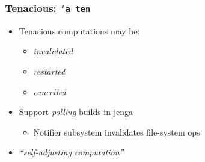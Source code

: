 \documentclass{beamer}
\begin{document}
% 
% 
% 


\begin{frame}[fragile]
\huge
\begin{center}
\end{center}
\end{frame}

% 

% 


\begin{frame}[fragile]
\frametitle{Tenacious: {\tt 'a ten}}
\begin{itemize}
\item Tenacious computations may be:
\begin{itemize}
\item {\em invalidated}
\item {\em restarted}
\item {\em cancelled}
\end{itemize}
\item Support {\em polling}\/ builds in jenga
\begin{itemize}
\item Notifier subsystem invalidates file-system ops
\end{itemize}
\item {\em ``self-adjusting computation''}
\end{itemize}
\end{frame}
\end{document}
